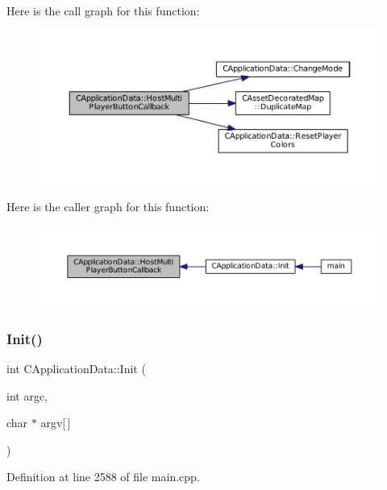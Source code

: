 Here is the call graph for this function\+:\nopagebreak
\begin{figure}[H]
\begin{center}
\leavevmode
\includegraphics[width=350pt]{classCApplicationData_a9f804f7f34e1f0abf8c395cd0032d811_cgraph}
\end{center}
\end{figure}
Here is the caller graph for this function\+:\nopagebreak
\begin{figure}[H]
\begin{center}
\leavevmode
\includegraphics[width=350pt]{classCApplicationData_a9f804f7f34e1f0abf8c395cd0032d811_icgraph}
\end{center}
\end{figure}
\hypertarget{classCApplicationData_ab757e7ad037decb18cefa3f4ad2e1298}{}\label{classCApplicationData_ab757e7ad037decb18cefa3f4ad2e1298} 
\subsubsection{\texorpdfstring{Init()}{Init()}}
{\footnotesize\ttfamily int C\+Application\+Data\+::\+Init (\begin{DoxyParamCaption}\item[{int}]{argc,  }\item[{char $\ast$}]{argv\mbox{[}$\,$\mbox{]} }\end{DoxyParamCaption})}



Definition at line 2588 of file main.\+cpp.



